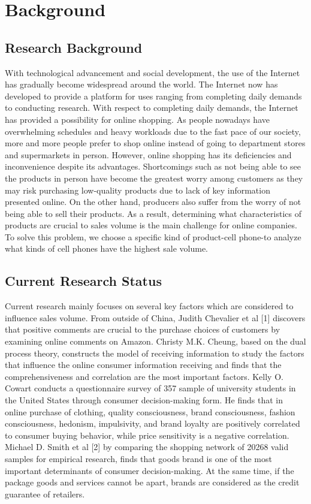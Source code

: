 \section{Background}

\subsection{Research Background}

With technological advancement and social development, the use of the Internet has gradually become widespread around the world. The Internet now has developed to provide a platform for uses ranging from completing daily demands to conducting research. With respect to completing daily demands, the Internet has provided a possibility for online shopping. As people nowadays have overwhelming schedules and heavy workloads due to the fast pace of our society, more and more people prefer to shop online instead of going to department stores and supermarkets in person. However, online shopping has its deficiencies and inconvenience despite its advantages. Shortcomings such as not being able to see the products in person have become the greatest worry among customers as they may risk purchasing low-quality products due to lack of key information presented online. On the other hand, producers also suffer from the worry of not being able to sell their products. As a result, determining what characteristics of products are crucial to sales volume is the main challenge for online companies. To solve this problem, we choose a specific kind of product-cell phone-to analyze what kinds of cell phones have the highest sale volume. 

\subsection{Current Research Status}

Current research mainly focuses on several key factors which are considered to influence sales volume. From outside of China, Judith Chevalier et al [1] discovers that positive comments are crucial to the purchase choices of customers by examining online comments on Amazon. Christy M.K. Cheung, based on the dual process theory, constructs the model of receiving information to study the factors that influence the online consumer information receiving and finds that the comprehensiveness and correlation are the most important factors. Kelly O. Cowart conducts a questionnaire survey of 357 sample of university students in the United States through consumer decision-making form. He finds that in online purchase of clothing, quality consciousness, brand consciousness, fashion consciousness, hedonism, impulsivity, and brand loyalty are positively correlated to consumer buying behavior, while price sensitivity is a negative correlation. Michael D. Smith et al [2] by comparing the shopping network of 20268 valid samples for empirical research, finds that goods brand is one of the most important determinants of consumer decision-making. At the same time, if the package goods and services cannot be apart, brands are considered as the credit guarantee of retailers. 

